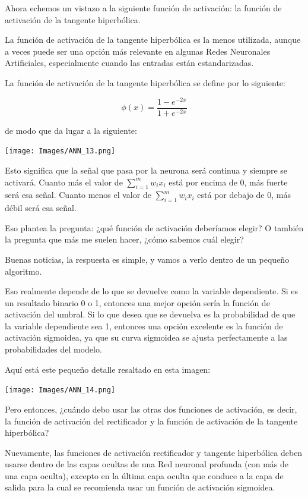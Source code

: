 \documentclass[
]{book}
\begin{document}
Ahora echemos un vistazo a la siguiente función de activación: la función de activación de la tangente hiperbólica.

La función de activación de la tangente hiperbólica es la menos utilizada, aunque a veces puede ser una opción más relevante en algunas Redes Neuronales Artificiales, especialmente cuando las entradas están estandarizadas.

La función de activación de la tangente hiperbólica se define por lo siguiente:

\[\phi(x) = \frac{1-e^{-2x}}{1+e^{-2x}}\]

de modo que da lugar a la siguiente:

\texttt{[image: Images/ANN\_13.png]}

Esto significa que la señal que pasa por la neurona será continua y siempre se activará. Cuanto más el valor de \(\sum_{i = 1}^m w_i x_i\) está por encima de 0, más fuerte será esa señal. Cuanto menos el valor de \(\sum_{i = 1}^m w_i x_i\) está por debajo de 0, más débil será esa señal.

Eso plantea la pregunta: ¿qué función de activación deberíamos elegir? O también la pregunta que más me suelen hacer, ¿cómo sabemos cuál elegir?

Buenas noticias, la respuesta es simple, y vamos a verlo dentro de un pequeño algoritmo.

Eso realmente depende de lo que se devuelve como la variable dependiente. Si es un resultado binario 0 o 1, entonces una mejor opción sería la función de activación del umbral. Si lo que desea que se devuelva es la probabilidad de que la variable dependiente sea 1, entonces una opción excelente es la función de activación sigmoidea, ya que su curva sigmoidea se ajusta perfectamente a las probabilidades del modelo.

Aquí está este pequeño detalle resaltado en esta imagen:

\texttt{[image: Images/ANN\_14.png]}

Pero entonces, ¿cuándo debo usar las otras dos funciones de activación, es decir, la función de activación del rectificador y la función de activación de la tangente hiperbólica?

Nuevamente, las funciones de activación rectificador y tangente hiperbólica deben usarse dentro de las capas ocultas de una Red neuronal profunda (con más de una capa oculta), excepto en la última capa oculta que conduce a la capa de salida para la cual se recomienda usar un función de activación sigmoidea.
\end{document}
